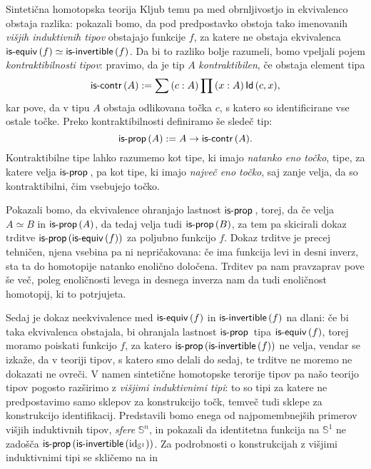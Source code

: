 \documentclass[a4paper, slovene]{article}
\begin{document}
\begin{section}{Sintetična homotopska teorija}
  Kljub temu pa med obrnljivostjo in ekvivalenco obstaja
  razlika: pokazali bomo, da pod predpostavko obstoja tako imenovanih
  \emph{višjih induktivnih tipov} obstajajo funkcije \(f\), za katere ne obstaja
  ekvivalenca \(\textnormal{\textsf{is-equiv}}\,(f) \simeq \textnormal{\textsf{is-invertible}}\,(f)\). Da bi to razliko bolje razumeli, bomo vpeljali
  pojem \emph{kontraktibilnosti tipov}: pravimo, da je tip \(A\) \emph{kontraktibilen},
  če obstaja element tipa
  \[\textnormal{\textsf{is-contr}}\,(A) := \sum \left( c : A \right) \prod \left( x : A \right) \textnormal{\textsf{Id}}\,(c, x),\]
  kar pove, da v tipu \(A\) obstaja odlikovana točka \(c\), s katero so identificirane
  vse ostale točke.
  Preko kontraktibilnosti definiramo še sledeč tip:
  \[\textnormal{\textsf{is-prop}}\,(A) := A \to \textnormal{\textsf{is-contr}}\,(A).\]
  Kontraktibilne tipe lahko razumemo kot tipe, ki imajo \emph{natanko eno točko},
  tipe, za katere velja \(\textnormal{\textsf{is-prop}}\,\), pa kot tipe, ki imajo \emph{največ eno točko}, saj
  zanje velja, da so kontraktibilni, čim vsebujejo točko.

  Pokazali bomo, da ekvivalence ohranjajo lastnost \(\textnormal{\textsf{is-prop}}\,\), torej, da
  če velja \(A \simeq B\) in \(\textnormal{\textsf{is-prop}}\,(A)\), da tedaj velja tudi \(\textnormal{\textsf{is-prop}}\,(B)\), za tem
  pa skicirali dokaz trditve \(\textnormal{\textsf{is-prop}}\,(\textnormal{\textsf{is-equiv}}\,(f))\) za poljubno funkcijo \(f\).
  Dokaz trditve je precej tehničen, njena vsebina pa ni nepričakovana:
  če ima funkcija levi in desni inverz, sta ta do homotopije natanko enolično določena.
  Trditev pa nam pravzaprav pove še več,
  poleg enoličnosti levega in desnega inverza nam da tudi enoličnost homotopij, ki to
  potrjujeta.

  Sedaj je dokaz neekvivalence med \(\textnormal{\textsf{is-equiv}}\,(f)\) in \(\textnormal{\textsf{is-invertible}}\,(f)\) na dlani: če bi taka
  ekvivalenca obstajala, bi ohranjala lastnost \(\textnormal{\textsf{is-prop}}\,\) tipa \(\textnormal{\textsf{is-equiv}}\,(f)\), torej
  moramo poiskati funkcijo \(f\), za katero \(\textnormal{\textsf{is-prop}}\,(\textnormal{\textsf{is-invertible}}\,(f))\) ne velja, vendar se
  izkaže, da v teoriji tipov, s katero smo delali do sedaj, te trditve ne moremo ne
  dokazati ne ovreči. V namen sintetične homotopske terorije tipov pa našo teorijo tipov
  pogosto razširimo z \emph{višjimi induktivnimi tipi}: to so tipi za katere ne
  predpostavimo samo sklepov za konstrukcijo točk, temveč tudi sklepe za konstrukcijo
  identifikacij. Predstavili bomo enega od najpomembnejših primerov višjih induktivnih
  tipov, \emph{sfere} \(\mathbb{S}^{n}\), in pokazali da identitetna funkcija
  na \(\mathbb{S}^{1}\) ne zadošča \(\textnormal{\textsf{is-prop}}\,(\textnormal{\textsf{is-invertible}}\,(\mathrm{id}_{\mathbb{S}^{1}}))\). Za
  podrobnosti o konstrukcijah z višjimi induktivnimi tipi se skličemo na
  \cite{hottbook} in \cite{ljungström2024symmetric}
\end{section}
\end{document}
